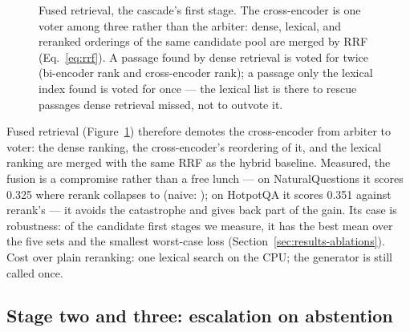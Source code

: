 \begin{figure}[t]
\centering
{}
\caption{Fused retrieval, the cascade's first stage. The cross-encoder is
one voter among three rather than the arbiter: dense, lexical, and
reranked orderings of the same candidate pool are merged by RRF
(Eq.~\ref{eq:rrf}). A passage found by dense retrieval is voted for twice
(bi-encoder rank and cross-encoder rank); a passage only the lexical index
found is voted for once --- the lexical list is there to rescue passages
dense retrieval missed, not to outvote it.}
\label{fig:arch-fused}
\end{figure}

Fused retrieval (Figure~\ref{fig:arch-fused}) therefore demotes the
cross-encoder from arbiter to voter: the dense ranking, the cross-encoder's
reordering of it, and the lexical ranking are merged with the same RRF as
the hybrid baseline. Measured, the fusion is a compromise rather than a
free lunch --- on NaturalQuestions it scores 0.325 where rerank collapses
to \RerankNQEM{} (naive: \NaiveRAGNQEM); on HotpotQA it scores 0.351
against rerank's \RerankHotpotQAEM{} --- it avoids the catastrophe and
gives back part of the gain. Its case is robustness: of the candidate
first stages we measure, it has the best mean over the five sets and the
smallest worst-case loss (Section~\ref{sec:results-ablations}). Cost over
plain reranking: one lexical search on the CPU; the generator is still
called once.

\subsection{Stage two and three: escalation on abstention}
\label{sec:cascade-escalation}

